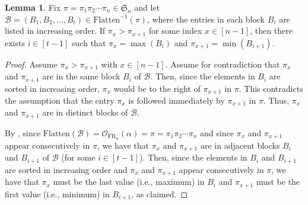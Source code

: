 \documentclass{amsart}
\newcommand{\Flatten}[0]{\mathrm{Flatten}}
\theoremstyle{definition}
\newtheorem{lemma}{Lemma}[section]
\theoremstyle{definition}
\theoremstyle{remark}
\newcommand{\FR}[1]{\mathrm{FR}_{#1}}
\newcommand{\out}{\mathcal{O}}
\newcommand{\Sym}{\mathfrak{S}}
\begin{document}
\begin{lemma}\label{lem:descent force blocks}
Fix $\pi=\pi_1\pi_2\cdots\pi_n\in\Sym_n$ and let $\mathcal{B}=(B_1,B_2,\ldots,B_t)\in\Flatten^{-1}(\pi)$, where the entries in each block $B_i$ are listed in increasing order.
If $\pi_x>\pi_{x+1}$ for some index $x\in[n-1]$, then there exists $i\in[t-1]$ such that $\pi_x=\max(B_i)$ and $\pi_{x+1}=\min(B_{{i+1}})$.
\end{lemma}
\begin{proof}
    Assume $\pi_x>\pi_{x+1}$ with  $x\in[n-1]$. Assume for contradiction that $\pi_x$ and $\pi_{x+1}$ are in the same block $B_i$ of $\mathcal{B}$. Then, since the elements in $B_i$ are sorted in increasing order, $\pi_x$ would be to the right of $\pi_{x+1}$ in $\pi$. This contradicts the assumption that the entry $\pi_x$ is followed immediately by $\pi_{x+1}$ in $\pi$.
    Thus, $\pi_x$ and $\pi_{x+1}$ are in distinct blocks of $\mathcal{B}$. 
    
    By , since $\Flatten(\mathcal{B})=\out_{\FR{n}}(\alpha)=\pi=\pi_1\pi_2\cdots\pi_n$ and since $\pi_x$ and $\pi_{x+1}$ appear consecutively in $\pi$, we have that $\pi_x$ and $\pi_{x+1}$ are in adjacent blocks $B_i$ and $B_{i+1}$ of $\mathcal{B}$ (for some $i\in[t-1]$). 
    Then, since the elements in $B_i$ and $B_{i+1}$ are sorted in increasing order and $\pi_x$ and $\pi_{x+1}$ appear consecutively in $\pi$, we have that $\pi_x$ must be the last value (i.e., maximum) in $B_i$ and $\pi_{x+1}$ must be the first value (i.e., minimum) in $B_{i+1}$, as claimed.
\end{proof}
\end{document}
